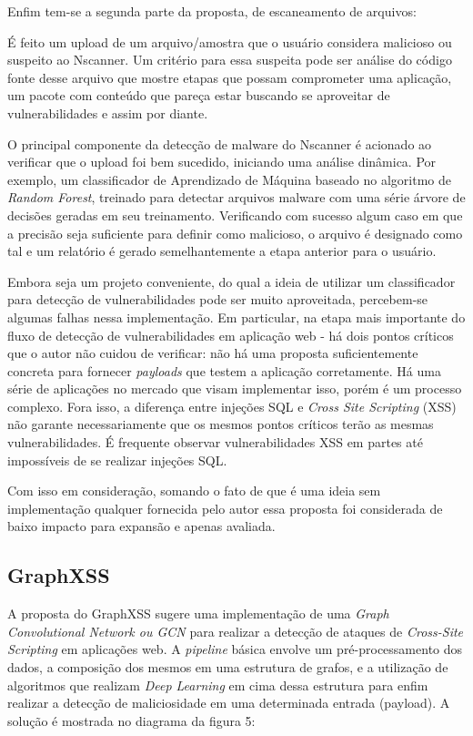 Enfim tem-se a segunda parte da proposta, de escaneamento de arquivos:
\begin{alineas}
\item É feito um upload de um arquivo/amostra que o usuário considera malicioso ou suspeito ao Nscanner. Um critério para essa suspeita pode ser análise do código fonte desse arquivo que mostre etapas que possam comprometer uma aplicação, um pacote com conteúdo que pareça estar buscando se aproveitar de vulnerabilidades e assim por diante. 
\item O principal componente da detecção de malware do Nscanner é acionado ao verificar que o upload foi bem sucedido, iniciando uma análise dinâmica. Por exemplo, um classificador de Aprendizado de Máquina baseado no algoritmo de \textit{Random Forest}, treinado para detectar arquivos malware com uma série árvore de decisões geradas em seu treinamento. Verificando com sucesso algum caso em que a precisão seja suficiente para definir como malicioso, o arquivo é designado como tal e um relatório é gerado semelhantemente a etapa anterior para o usuário.
\end{alineas}

Embora seja um projeto conveniente, do qual a ideia de utilizar um classificador para detecção de vulnerabilidades pode ser muito aproveitada,  percebem-se algumas falhas nessa implementação. Em particular, na etapa mais importante do fluxo de detecção de vulnerabilidades em aplicação web - há dois pontos críticos que o autor não cuidou de verificar: não há uma proposta suficientemente concreta para fornecer \textit{payloads} que testem a aplicação corretamente. Há uma série de aplicações no mercado que visam implementar isso, porém é um processo complexo. Fora isso, a diferença entre injeções SQL e \textit{Cross Site Scripting} (XSS) não garante necessariamente que os mesmos pontos críticos terão as mesmas vulnerabilidades. É frequente observar vulnerabilidades XSS em partes até impossíveis de se realizar injeções SQL.

Com isso em consideração, somando o fato de que é uma ideia sem implementação qualquer fornecida pelo autor essa proposta foi considerada de baixo impacto para expansão e apenas avaliada.

\subsection{GraphXSS}
A proposta do GraphXSS \cite{liu_graphxss_2022} sugere uma implementação de uma \textit{Graph Convolutional Network ou GCN} para realizar a detecção de ataques de \textit{Cross-Site Scripting} em aplicações web. A \textit{pipeline} básica envolve um pré-processamento dos dados, a composição dos mesmos em uma estrutura de grafos, e a utilização de algoritmos que realizam \textit{Deep Learning} em cima dessa estrutura para enfim realizar a detecção de maliciosidade em uma determinada entrada (payload). A solução é mostrada no diagrama da figura 5: 

